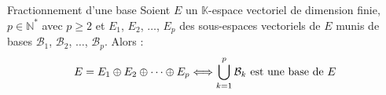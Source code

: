 \documentclass[french,11pt,twoside]{VcCours}
\begin{document}


\begin{Proposition}{Fractionnement d'une base}\label{UnionBase} Soient $E$ un $\mathbb{K}$-espace vectoriel de dimension finie, $p \in \mathbb{N}^*$ avec $p \geq 2$ et $E_1$, $E_2$, $\ldots$, $E_p$ des sous-espaces vectoriels de $E$ munis de bases $\mathcal{B}_1$, $\mathcal{B}_2$, $\ldots$, $\mathcal{B}_p$. Alors :
$$ E= E_1 \oplus E_2 \oplus \cdots \oplus E_p \Longleftrightarrow  \bigcup_{k=1}^p \mathcal{B}_k \hbox{ est une base de } E$$
\end{Proposition}
\end{document}

